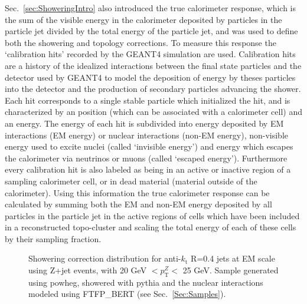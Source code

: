Sec.~\ref{sec:ShoweringIntro} also introduced the true calorimeter response, which is the sum of the visible energy in the calorimeter deposited by particles in the particle jet divided by the total energy of the particle jet, and was used to define both the showering and topology corrections.  
To measure this response the `calibration hits' recorded by the GEANT4 simulation are used.  
Calibration hits are a history of the idealized interactions between the final state particles and the detector used by GEANT4 to model the deposition of energy by theses particles into the detector and the production of secondary particles advancing the shower.  
Each hit corresponds to a single stable particle which initialized the hit, and is characterized by an position (which can be associated with a calorimeter cell) and an energy.  
The energy of each hit is subdivided into energy deposited by EM interactions (EM energy) or nuclear interactions (non-EM energy), non-visible energy used to excite nuclei (called `invisible energy') and energy which escapes the calorimeter via neutrinos or muons (called `escaped energy').  
Furthermore every calibration hit is also labeled as being in an active or inactive region of a sampling calorimeter cell, or in dead material (material outside of the calorimeter).  
Using this information the true calorimeter response can be calculated by summing both the EM and non-EM energy deposited by all particles in the particle jet in the active regions of cells which have been included in a reconstructed topo-cluster and scaling the total energy of each of these cells by their sampling fraction.   
 
\begin{figure}[!ht]
 \begin{center}
 \end{center}
 \caption[Example showering correction distribution]
 {\small Showering correction distribution for anti-$k_{\mathrm t}$ R=0.4 jets at EM scale using Z+jet events, with 20 GeV $< p_{\mathrm T}^Z <$ 25 GeV.  Sample generated using {\sc powheg}, showered with {\sc pythia} and the nuclear interactions modeled using FTFP\_BERT (see Sec.~\ref{Sec:Samples}).   }
 \label{Fig:ShoweringDistExample}
\end{figure}

